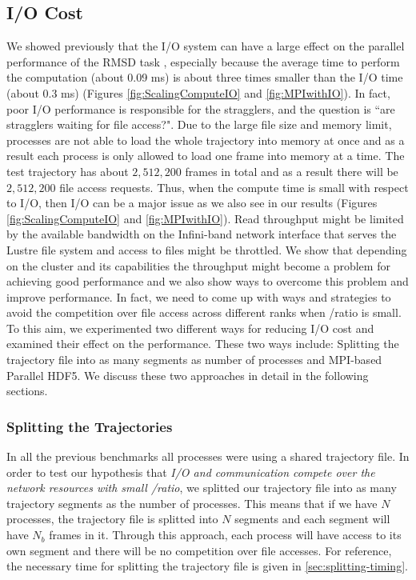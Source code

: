 \subsection{I/O Cost}
\label{I/O}
We showed previously that the I/O system can have a large effect on the parallel performance of the RMSD task \cite{Khoshlessan:2017ab},
especially because the average time to perform the computation \tcomp (about 0.09 ms) is about three times smaller than the I/O time \tIO (about 0.3 ms) (Figures \ref{fig:ScalingComputeIO} and \ref{fig:MPIwithIO}). 
In fact, poor I/O performance is responsible for the stragglers, and the question is ``are stragglers waiting for file access?". 
Due to the large file size and memory limit, processes are not able to load the whole trajectory into memory at once and as a result each process is only allowed to load one frame into memory at a time.
The test trajectory has about $2,512,200$ frames in total and as a result there will be $2,512,200$ file access requests. 
Thus, when the compute time is small with respect to I/O, then I/O can be a major issue as we also see in our results (Figures \ref{fig:ScalingComputeIO} and \ref{fig:MPIwithIO}).    
Read throughput might be limited by the available bandwidth on the Infini-band network interface that serves the Lustre file system and access to files might be throttled.
We show that depending on the cluster and its capabilities the throughput might become a problem for achieving good performance and we also show ways to overcome this problem and improve performance.
In fact, we need to come up with ways and strategies to avoid the competition over file access across different ranks when \tcomp/\tIO ratio is small.
To this aim, we experimented two different ways for reducing I/O cost and examined their effect on the performance.
These two ways include: Splitting the trajectory file into as many segments as number of processes and MPI-based Parallel HDF5.
We discuss these two approaches in detail in the following sections.

\subsubsection{Splitting the Trajectories}
\label{Splitting}
In all the previous benchmarks all processes were using a shared trajectory file.
In order to test our hypothesis that \emph{I/O and communication compete over the network resources with small \tcomp/\tIO ratio}, we splitted our trajectory file into as many trajectory segments as the number of processes.
This means that if we have $N$ processes, the trajectory file is splitted into $N$ segments and each segment will have $N_{b}$ frames in it. 
Through this approach, each process will have access to its own segment and there will be no competition over file accesses. 
For reference, the necessary time for splitting the trajectory file is given in \ref{sec:splitting-timing}.

